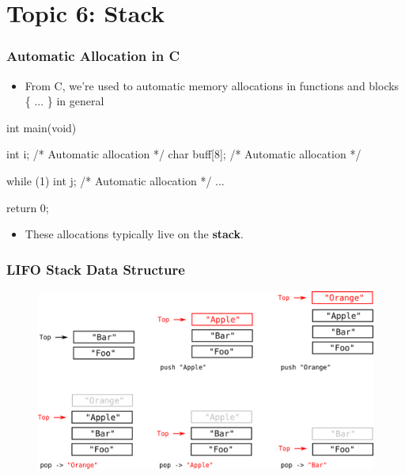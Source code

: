 \documentclass[11pt,xcolor=dvipsnames]{beamer}
\begin{document}
\section{Topic 6: Stack}

\begin{frame}[fragile,t]
\frametitle{Automatic Allocation in C}
\begin{itemize}
  \item From C, we're used to automatic memory allocations in functions and blocks \{ ... \} in general
\end{itemize}
\begin{ccode}
int main(void) {
  int i;            /* Automatic allocation */
  char buff[8];     /* Automatic allocation */

  while (1) {
    int j;          /* Automatic allocation */
    ...
  }

  return 0;
}
\end{ccode}
\begin{itemize}
  \item These allocations typically live on the {\bf stack}.
\end{itemize}
\end{frame}

\begin{frame}[fragile,t]
\frametitle{LIFO Stack Data Structure}
\begin{figure}
\centering
\includegraphics[height=0.60\paperheight]{figures/lifostack.png}
\end{figure}
\end{frame}
\end{document}
